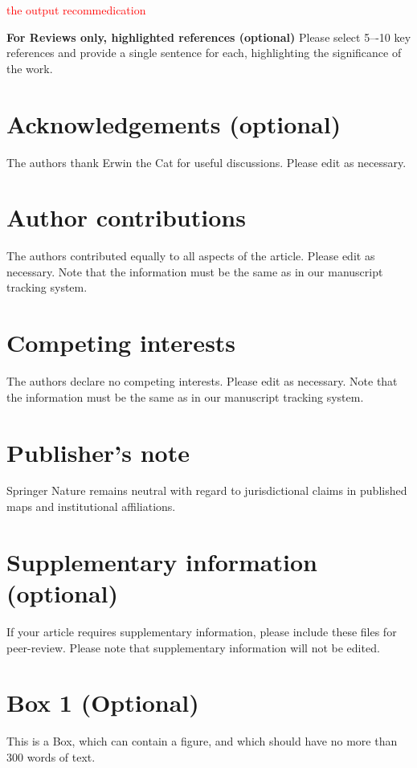 \documentclass[fleqn,11pt]{wlscirep}
\newcommand{\ydnote}[1]{\textcolor{red}{#1}}
\begin{document}
\ydnote{the output recommedication }



\noindent \textbf{For Reviews only, highlighted references (optional)} Please select 5–-10 key references and provide a single sentence for each, highlighting the significance of the work.

\section*{Acknowledgements (optional)}
The authors thank Erwin the Cat for useful discussions. Please edit as necessary.

\section*{Author contributions}
The authors contributed equally to all aspects of the article. Please edit as necessary. Note that the information must be the same as in our manuscript tracking system.

\section*{Competing interests}
The authors declare no competing interests. Please edit as necessary. Note that the information must be the same as in our manuscript tracking system.

\section*{Publisher’s note}
Springer Nature remains neutral with regard to jurisdictional claims in published maps and institutional affiliations.

\section*{Supplementary information (optional)}
If your article requires supplementary information, please include these files for peer-review. Please note that supplementary information will not be edited.

\newpage
\section*{Box 1 (Optional)}
This is a Box, which can contain a figure, and which should have no more than 300 words of text.
\end{document}
